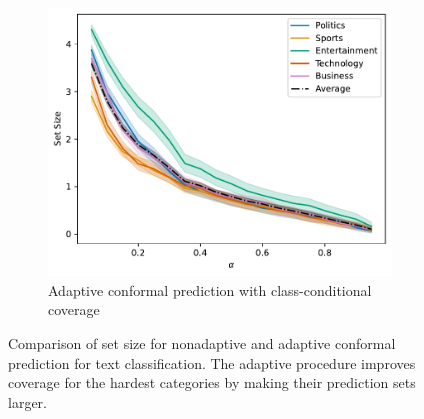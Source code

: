 \documentclass[a4paper, 12pt]{article}
\begin{document}
\begin{figure}[ht]
\begin{subfigure}[b]{0.5\linewidth}
    \end{subfigure}
    \begin{subfigure}[b]{0.5\linewidth}
        \includegraphics[width=\linewidth]{figures/labelwise_set_size.pdf}
        \caption{Adaptive conformal prediction with class-conditional coverage}
        \label{fig:labelwise_set_size}
    \end{subfigure}
    \caption{Comparison of set size for nonadaptive and adaptive conformal prediction for text classification. The adaptive procedure improves coverage for the hardest categories by making their prediction sets larger.}
    \label{fig:set_size}
\end{figure}

\newpage
\printbibliography %
\end{document}
